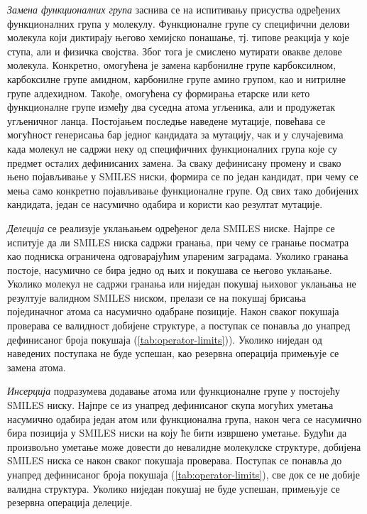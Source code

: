 \documentclass[12pt,oneside]{memoir}
\begin{document}
\textit{Замена функционалних група} заснива се на испитивању 
присуства одређених функционалних група у молекулу. 
Функционалне групе су специфични делови молекула који 
диктирају његово хемијско понашање, тј. типове реакција у које 
ступа, али и физичка својства. Због тога је смислено 
мутирати овакве делове молекула. Конкретно, омогућена је 
замена карбонилне групе карбоксилном, карбоксилне групе 
амидном, карбонилне групе амино групом, као и нитрилне 
групе алдехидном. Такође, омогућена су формирања етарске 
или кето функционалне групе између два суседна атома угљеника, 
али и продужетак угљеничног ланца. Постојањем последње 
наведене мутације, повећава се могућност генерисања бар једног
кандидата за мутацију, чак и у случајевима када молекул не садржи
неку од специфичних функционалних група које су предмет осталих 
дефинисаних замена.
За сваку дефинисану промену и свако њено појављивање у 
SMILES ниски, формира се по један кандидат, 
при чему се мења само конкретно појављивање функционалне групе. 
Од свих тако добијених кандидата, један се насумично одабира 
и користи као резултат мутације.

\textit{Делеција} се реализује уклањањем одређеног дела 
SMILES ниске. Најпре се испитује да ли SMILES ниска садржи 
гранања, при чему се гранање посматра као подниска ограничена 
одговарајућим упареним заградама. Уколико гранања постоје, 
насумично се бира једно од њих и покушава се његово уклањање. 
Уколико молекул не садржи гранања или ниједан покушај 
њиховог уклањања не резултује валидном SMILES ниском, 
прелази се на покушај брисања појединачног атома са насумично 
одабране позиције. Након сваког покушаја проверава се 
валидност добијене структуре, а поступак се понавља до 
унапред дефинисаног броја покушаја (\ref{tab:operator-limits})). Уколико ниједан од 
наведених поступака не буде успешан, као резервна операција 
примењује се замена атома.

\textit{Инсерција} подразумева додавање атома или функционалне 
групе у постојећу SMILES ниску. Најпре се из унапред 
дефинисаног скупа могућих уметања насумично одабира један 
атом или функционална група, након чега се насумично бира 
позиција у SMILES ниски на коју ће бити извршено уметање. 
Будући да произвољно уметање може довести до невалидне 
молекулске структуре, добијена SMILES ниска се након сваког 
покушаја проверава. Поступак се понавља до унапред дефинисаног 
броја покушаја (\ref{tab:operator-limits}), све док се не добије валидна структура. 
Уколико ниједан покушај не буде успешан, примењује се 
резервна операција делеције.
\end{document}
